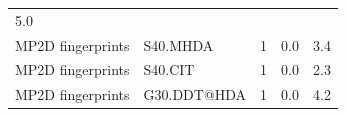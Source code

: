 \documentclass[utf8]{frontiersHLTH} %
\begin{document}
\begin{longtable}[]{@{}lllll@{}}
\begin{minipage}[t]{0.08\columnwidth}
5.0\strut
\end{minipage}\tabularnewline
\begin{minipage}[t]{0.26\columnwidth}\raggedright\strut
MP2D fingerprints\strut
\end{minipage} & \begin{minipage}[t]{0.21\columnwidth}\raggedright\strut
S40.MHDA\strut
\end{minipage} & \begin{minipage}[t]{0.06\columnwidth}\raggedright\strut
1\strut
\end{minipage} & \begin{minipage}[t]{0.15\columnwidth}\raggedright\strut
0.0\strut
\end{minipage} & \begin{minipage}[t]{0.08\columnwidth}\raggedright\strut
3.4\strut
\end{minipage}\tabularnewline
\begin{minipage}[t]{0.26\columnwidth}\raggedright\strut
MP2D fingerprints\strut
\end{minipage} & \begin{minipage}[t]{0.21\columnwidth}\raggedright\strut
S40.CIT\strut
\end{minipage} & \begin{minipage}[t]{0.06\columnwidth}\raggedright\strut
1\strut
\end{minipage} & \begin{minipage}[t]{0.15\columnwidth}\raggedright\strut
0.0\strut
\end{minipage} & \begin{minipage}[t]{0.08\columnwidth}\raggedright\strut
2.3\strut
\end{minipage}\tabularnewline
\begin{minipage}[t]{0.26\columnwidth}\raggedright\strut
MP2D fingerprints\strut
\end{minipage} & \begin{minipage}[t]{0.21\columnwidth}\raggedright\strut
G30.DDT@HDA\strut
\end{minipage} & \begin{minipage}[t]{0.06\columnwidth}\raggedright\strut
1\strut
\end{minipage} & \begin{minipage}[t]{0.15\columnwidth}\raggedright\strut
0.0\strut
\end{minipage} & \begin{minipage}[t]{0.08\columnwidth}\raggedright\strut
4.2\strut
\end{minipage}\tabularnewline

\end{longtable}
\end{document}
